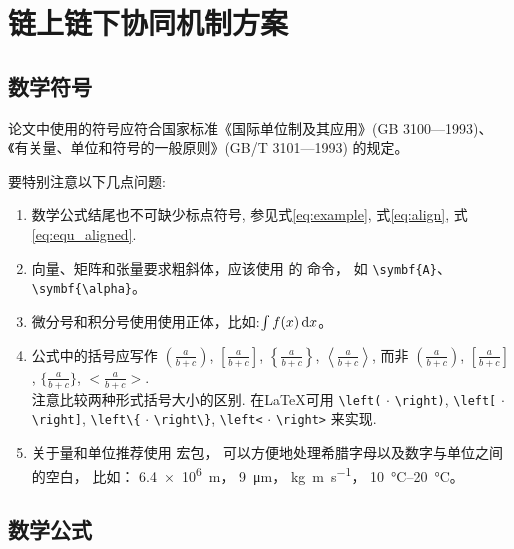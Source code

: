 
\chapter{链上链下协同机制方案}\label{equations}

\section{数学符号}

论文中使用的符号应符合国家标准《国际单位制及其应用》(GB 3100—1993)、《有关量、单位和符号的一般原则》(GB/T 3101—1993) 的规定。

要特别注意以下几点问题:

\begin{enumerate}
\item 数学公式结尾也不可缺少标点符号, 参见式\eqref{eq:example}, 式\eqref{eq:align}, 式\eqref{eq:equ_aligned}.
    \item 向量、矩阵和张量要求粗斜体，应该使用  的  命令，
          如 \verb|\symbf{A}|、\verb|\symbf{\alpha}|。
    \item 微分号和积分号使用使用正体，比如:$\int f(x) \mathop{}\!\mathrm{d} x$。
    \item 公式中的括号应写作 $\displaystyle \left(\frac{a}{b + c}\right)$, $\displaystyle \left[\frac{a}{b + c}\right]$, $\displaystyle \left\{\frac{a}{b + c}\right\}$, $\displaystyle \left<\frac{a}{b + c}\right>$, 而非 $\displaystyle (\frac{a}{b + c})$, $\displaystyle [\frac{a}{b + c}]$, $\displaystyle \{\frac{a}{b + c}\}$, $\displaystyle <\frac{a}{b + c}>$.\\
    注意比较两种形式括号大小的区别. 在\LaTeX{}可用 \verb|\left(| $\cdot$ \verb|\right)|, \verb|\left[| $\cdot$ \verb|\right]|, \verb|\left\{| $\cdot$ \verb|\right\}|, \verb|\left<| $\cdot$ \verb|\right>| 来实现.
    \item 关于量和单位推荐使用\href{http://mirrors.ctan.org/macros/latex/contrib/siunitx/siunitx.pdf}{}
宏包，
        可以方便地处理希腊字母以及数字与单位之间的空白，
        比如：
        \SI{6.4e6}{m}，
        \SI{9}{\micro\meter}，
        \si{kg.m.s^{-1}}，
        \SIrange{10}{20}{\degreeCelsius}。
\end{enumerate}

\section{数学公式}

